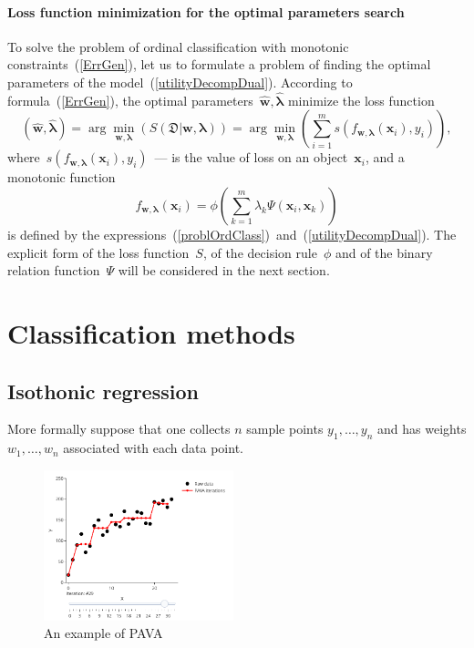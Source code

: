 \documentclass[12pt,preprint]{elsarticle}
\newcommand{\blambda}{\boldsymbol{\lambda}}
\newcommand{\bx}{\mathbf{x}}
\newcommand{\bw}{\mathbf{w}}
\begin{document}
\paragraph{Loss function minimization for the optimal parameters search}
To solve the problem of ordinal classification with monotonic constraints~(\ref{ErrGen}), let us to formulate a problem of finding the optimal parameters of the model~(\ref{utilityDecompDual}).
According to formula~(\ref{ErrGen}), the optimal parameters~$\hat{\bw},\hat{\blambda}$ minimize the loss function
\[
(\hat{\bw},\hat{\blambda})=\arg\min\limits_{\bw,\blambda}\left(S(\mathfrak{D}|\bw,\blambda)\right)=\arg\min\limits_{\bw,\blambda}\left(\sum\limits_{i=1}^m{s(f_{\bw,\blambda}(\bx_i), y_i)}\right),
\]
where~$s(f_{\bw,\blambda}(\bx_i), y_i)$~--- is the value of loss on an object~$\bx_i$, and a monotonic function
\begin{equation}
f_{\bw,\blambda}(\bx_i) = \phi\left(\sum\limits_{k=1}^m \lambda_{k} \Psi(\bx_i, \bx_k)\right)
\label{ordClassMdl}
\end{equation}
is defined by the expressions~(\ref{problOrdClass})~and~(\ref{utilityDecompDual}).
The explicit form of the loss function~$S$, of the decision rule~$\phi$ and of the binary relation function~$\Psi$ will be considered in the next section.
\section{Classification methods}
\subsection{Isothonic regression}


More formally suppose that one collects $n$ sample points $y_1,\dots, y_n$ and has weights $w_1, \dots, w_n$ associated with each data point.

\begin{figure}[h]
\begin{center}
\includegraphics[width=0.49\textwidth]{fig1.png}
\caption{An example of PAVA}
\label{figMatrices}
\end{center}
\end{figure}
\end{document}
